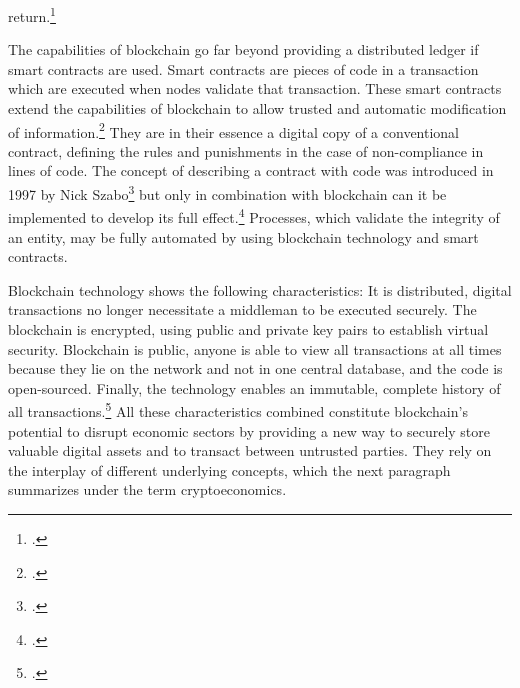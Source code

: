 return.\footcites[Cf.][p.12]{CataliniSimpleEconomicsBlockchain2017}[cf.][p.5 et seqq]{DavidsonEconomicsBlockchain2016}   



The capabilities of blockchain go far beyond providing a distributed ledger if smart contracts are used. Smart contracts are pieces of code in a transaction which are executed when nodes validate that transaction. These smart contracts extend the capabilities of blockchain to allow trusted and automatic modification of information.\footcite[Cf.][p.14]{Schutte.2017} They are in their essence a digital copy of a conventional contract, defining the rules and punishments in the case of non-compliance in lines of code. The concept of describing a contract with code was introduced in 1997 by Nick Szabo\footcite[][]{Szabo.1997} but only in combination with blockchain can it be implemented to develop its full effect.\footcites[Cf.][p.23]{Schlatt.2016}[cf.][p.22-24]{GOV.2016} Processes, which validate the integrity of an entity, may be fully automated by using blockchain technology and smart contracts.

Blockchain technology shows the following characteristics: It is distributed, digital transactions no longer necessitate a middleman to be executed securely. The blockchain is encrypted, using public and private key pairs to establish virtual security. Blockchain is public, anyone is able to view all transactions at all times because they lie on the network and not in one central database, and the code is open-sourced. Finally, the technology enables an immutable, complete history of all transactions.\footcite[Cf.][p.5]{Tapscott.2017} All these characteristics combined constitute blockchain's potential to disrupt economic sectors by providing a new way to securely store valuable digital assets and to transact between untrusted parties. They rely on the interplay of different underlying concepts, which the next paragraph summarizes under the term cryptoeconomics.


